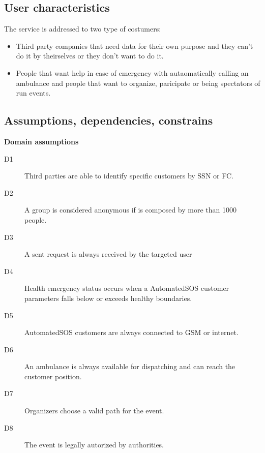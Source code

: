\documentclass[../main.tex]{subfiles}
\begin{document}
\subsection{User characteristics}
The service is addressed to two type of costumers:
\begin{itemize}
	\item Third party companies that need data for their own purpose and they can't do it by theirselves or they don't want to do it.
	\item People that want help in case of emergency with autaomatically calling an ambulance and people that want to organize, paricipate or being spectators of run events.
\end{itemize}

\subsection{Assumptions, dependencies, constrains}

{\bf Domain assumptions}

\begin{description}

	\item [D1] Third parties are able to identify specific customers by SSN or FC.
	\item [D2] A group is considered anonymous if is composed by more than 1000 people.
	\item [D3]  A sent request is always received by the targeted user
	\item [D4] Health emergency status occurs when a AutomatedSOS customer parameters falls below or exceeds healthy boundaries.
	\item [D5] AutomatedSOS customers are always connected to GSM or internet.
	\item [D6] An ambulance is always available for dispatching and can reach the customer position.
	\item [D7] Organizers choose a valid path for the event.
	\item [D8] The event is legally autorized by authorities.

\end{description}
\end{document}
